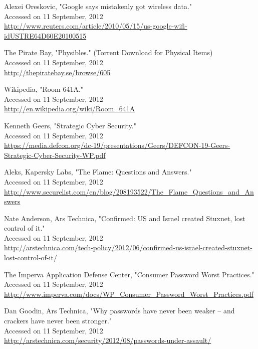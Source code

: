 \documentclass[11pt]{article}
\begin{document}
\begin{thebibliography}{9}

	Alexei Oreskovic,
	"Google says mistakenly got wireless data." \\
	Accessed on 11 September, 2012 \\
	\url{http://www.reuters.com/article/2010/05/15/us-google-wifi-idUSTRE64D60E20100515}
	
	The Pirate Bay,
	"Physibles." (Torrent Download for Physical Items) \\
	Accessed on 11 September, 2012 \\
	\url{http://thepiratebay.se/browse/605}
	
	Wikipedia,
	"Room 641A." \\
	Accessed on 11 September, 2012 \\
	\url{http://en.wikipedia.org/wiki/Room_641A}
	

	Kenneth Geers,
	"Strategic Cyber Security."\\
	Accessed on 11 September, 2012 \\
	\url{https://media.defcon.org/dc-19/presentations/Geers/DEFCON-19-Geers-Strategic-Cyber-Security-WP.pdf}
	
	Aleks, Kapersky Labs,
	"The Flame: Questions and Answers."\\
	Accessed on 11 September, 2012 \\
	\url{http://www.securelist.com/en/blog/208193522/The_Flame_Questions_and_Answers}
	
	Nate Anderson, Ars Technica,
	"Confirmed: US and Israel created Stuxnet, lost control of it."\\
	Accessed on 11 September, 2012 \\
	\url{http://arstechnica.com/tech-policy/2012/06/confirmed-us-israel-created-stuxnet-lost-control-of-it/}
	
	The Imperva Application Defense Center,
	"Consumer Password Worst Practices."\\
	Accessed on 11 September, 2012 \\
	\url{http://www.imperva.com/docs/WP_Consumer_Password_Worst_Practices.pdf}
	
	Dan Goodin, Ars Technica,
	"Why passwords have never been weaker -- and crackers have never been stronger." \\
	Accessed on 11 September, 2012 \\
	\url{http://arstechnica.com/security/2012/08/passwords-under-assault/}
	

	

\end{thebibliography}
\end{document}
